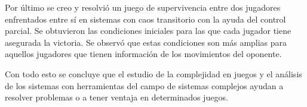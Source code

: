 Por último se creo y resolvió un juego de supervivencia entre dos jugadores enfrentados entre sí en sistemas con caos transitorio con la ayuda del control parcial. Se obtuvieron las condiciones iniciales para las que cada jugador tiene asegurada la victoria. Se observó que estas condiciones son más amplias para aquellos jugadores que tienen información de los movimientos del oponente.

Con todo esto se concluye que el estudio de la complejidad en juegos y el análisis de los sistemas con herramientas del campo de sistemas complejos ayudan a resolver problemas o a tener ventaja en determinados juegos.



